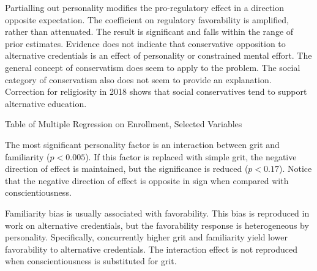\documentclass[review]{elsarticle}
\begin{document}
Partialling out personality modifies the pro-regulatory effect in a direction opposite expectation.
The coefficient on regulatory favorability is amplified, rather than attenuated.
The result is significant and falls within the range of prior estimates.
Evidence does not indicate that conservative opposition to alternative credentials is an effect of personality or constrained mental effort.
The general concept of conservatism does seem to apply to the problem.
The social category of conservatism also does not seem to provide an explanation.
Correction for religiosity in 2018 shows that social conservatives tend to support alternative education.

\begin{table}
    \caption{Table of Multiple Regression on Enrollment, Selected Variables}
    \resizebox{\columnwidth}{!}{
        
    }
    \label{tab:table_new_ols}
\end{table}

The most significant personality factor is an interaction between grit and familiarity ($p<0.005$).
If this factor is replaced with simple grit,
the negative direction of effect is maintained, but the significance is reduced ($p<0.17$).
Notice that the negative direction of effect is opposite in sign when compared with conscientiousness.

Familiarity bias is usually associated with favorability.
This bias is reproduced in work on alternative credentials,
but the favorability response is heterogeneous by personality.
Specifically, concurrently higher grit and familiarity yield lower favorability to alternative credentials.
The interaction effect is not reproduced when conscientiousness is substituted for grit.
\end{document}

